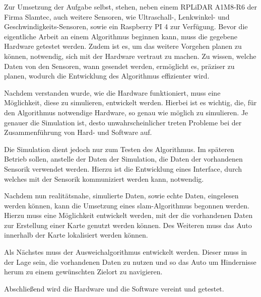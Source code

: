 Zur Umsetzung der Aufgabe selbst, stehen, neben einem RPLiDAR A1M8-R6 der Firma Slamtec, auch weitere Sensoren, 
wie Ultraschall-, Lenkwinkel- und Geschwindigkeits-Sensoren, sowie ein Raspberry PI 4 zur Verfügung.
Bevor die eigentliche Arbeit an einem Algorithmus beginnen kann, muss die gegebene Hardware getestet werden. 
Zudem ist es, um das weitere Vorgehen planen zu können, notwendig, sich mit der Hardware vertraut zu machen. 
Zu wissen, welche Daten von den Sensoren, wann gesendet werden, ermöglicht es, präziser zu planen, wodurch die Entwicklung des Algorithmus effizienter wird.

Nachdem verstanden wurde, wie die Hardware funktioniert, muss eine Möglichkeit, diese zu simulieren, entwickelt werden.
Hierbei ist es wichtig, die, für den Algorithmus notwendige Hardware, so genau wie möglich zu simulieren. 
Je genauer die Simulation ist, desto unwahrscheinlicher treten Probleme bei der Zusammenführung von Hard- und Software auf.

Die Simulation dient jedoch nur zum Testen des Algorithmus.
Im späteren Betrieb sollen, anstelle der Daten der Simulation, die Daten der vorhandenen Sensorik verwendet werden.
Hierzu ist die Entwicklung eines Interface, durch welches mit der Sensorik kommuniziert werden kann, notwendig.

Nachdem nun realitätsnahe, simulierte Daten, sowie echte Daten, eingelesen werden können, kann die Umsetzung eines \acf{slam}-Algorithmus begonnen werden.
Hierzu muss eine Möglichkeit entwickelt werden, mit der die vorhandenen Daten zur Erstellung einer Karte genutzt werden können.
Des Weiteren muss das Auto innerhalb der Karte lokalisiert werden können.

Als Nächstes muss der Ausweichalgorithmus entwickelt werden.
Dieser muss in der Lage sein, die vorhandenen Daten zu nutzen und so das Auto um Hindernisse herum zu einem gewünschten Zielort zu navigieren.

Abschließend wird die Hardware und die Software vereint und getestet.

\newpage
